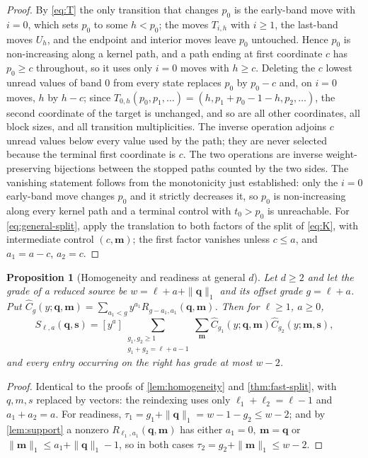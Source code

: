 \documentclass[11pt,reqno]{amsart}
\newtheorem{proposition}[theorem]{Proposition}
\theoremstyle{definition}
\theoremstyle{remark}
\newcommand{\Chat}{\widehat C}
\begin{document}
\begin{proof}
By \eqref{eq:T} the only transition that changes $p_0$ is the early-band
move with $i=0$, which sets $p_0$ to some $h<p_0$; the moves $T_{i,h}$ with
$i\geq1$, the last-band moves $U_h$, and the endpoint and interior moves
leave $p_0$ untouched.  Hence $p_0$ is non-increasing along a kernel path,
and a path ending at first coordinate $c$ has $p_0\geq c$ throughout, so it
uses only $i=0$ moves with $h\geq c$.  Deleting the $c$ lowest unread values
of band $0$ from every state replaces $p_0$ by $p_0-c$ and, on $i=0$ moves,
$h$ by $h-c$; since
$T_{0,h}(p_0,p_1,\ldots)=(h,p_1+p_0-1-h,p_2,\ldots)$, the second coordinate
of the target is unchanged, and so are all other coordinates, all block
sizes, and all transition multiplicities.  The inverse operation adjoins $c$
unread values below every value used by the path; they are never selected
because the terminal first coordinate is $c$.  The two operations are
inverse weight-preserving bijections between the stopped paths counted by
the two sides.  The vanishing statement follows from the monotonicity just
established: only the $i=0$ early-band move changes $p_0$ and it strictly
decreases it, so $p_0$ is non-increasing along every kernel path and a
terminal control with $t_0>p_0$ is unreachable.  For
\eqref{eq:general-split}, apply the
translation to both factors of the split of \eqref{eq:K}, with intermediate
control $(c,\mathbf m)$; the first factor vanishes unless $c\leq a$, and
$a_1=a-c$, $a_2=c$.
\end{proof}

\begin{proposition}[Homogeneity and readiness at general
$d$]\label{prop:general-homogeneity}
Let $d\geq2$ and let the grade of a reduced source be
$w=\ell+a+\|\mathbf q\|_1$ and its offset grade $g=\ell+a$.  Put
$\Chat_g(y;\mathbf q,\mathbf m)=\sum_{a_1<g}y^{a_1}
R_{g-a_1,a_1}(\mathbf q,\mathbf m)$.  Then for $\ell\geq1$, $a\geq0$,
\begin{equation}\label{eq:general-fast-split}
 S_{\ell,a}(\mathbf q,\mathbf s)=[y^a]
 \sum_{\substack{g_1,g_2\geq1\\ g_1+g_2=\ell+a-1}}\sum_{\mathbf m}
 \Chat_{g_1}(y;\mathbf q,\mathbf m)\Chat_{g_2}(y;\mathbf m,\mathbf s),
\end{equation}
and every entry occurring on the right has grade at most $w-2$.
\end{proposition}

\begin{proof}
Identical to the proofs of \cref{lem:homogeneity} and
\cref{thm:fast-split}, with $q,m,s$ replaced by vectors: the reindexing uses
only $\ell_1+\ell_2=\ell-1$ and $a_1+a_2=a$.  For readiness,
$\tau_1=g_1+\|\mathbf q\|_1=w-1-g_2\leq w-2$; and by \cref{lem:support} a
nonzero $R_{\ell_1,a_1}(\mathbf q,\mathbf m)$ has either
$a_1=0,\ \mathbf m=\mathbf q$ or $\|\mathbf m\|_1\leq a_1+\|\mathbf
q\|_1-1$, so in both cases $\tau_2=g_2+\|\mathbf m\|_1\leq w-2$.
\end{proof}
\end{document}
